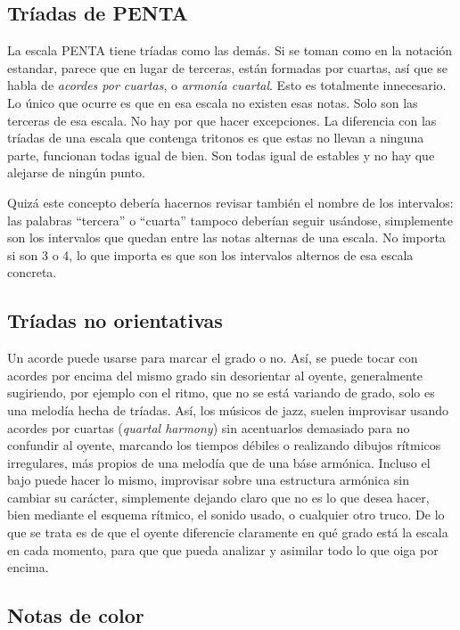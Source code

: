 \documentclass[]{report}
\begin{document}
\subsection{Tríadas de \textsf{PENTA}}

La escala \textsf{PENTA} tiene tríadas como las demás. Si se toman como en la notación estandar, parece que en lugar de terceras, están formadas por cuartas, así que se habla de \emph{acordes por cuartas}, o \emph{armonía cuartal}. Esto es totalmente innecesario. Lo único que ocurre es que en esa escala no existen esas notas. Solo son las terceras de esa escala. No hay por que hacer excepciones. La diferencia con las tríadas de una escala que contenga tritonos es que estas no llevan a ninguna parte, funcionan todas igual de bien. Son todas igual de estables y no hay que alejarse de ningún punto. 

Quizá este concepto debería hacernos revisar también el nombre de los intervalos: las palabras ``tercera'' o ``cuarta'' tampoco deberían seguir usándose, simplemente son los intervalos que quedan entre las notas alternas de una escala. No importa si son 3 o 4, lo que importa es que son los intervalos alternos de esa escala concreta.

\subsection{Tríadas no orientativas}

Un acorde puede usarse para marcar el grado o no. Así, se puede tocar con acordes por encima del mismo grado sin desorientar al oyente, generalmente sugiriendo, por ejemplo con el ritmo, que no se está variando de grado, solo es una melodía hecha de tríadas. Así, los músicos de jazz, suelen improvisar usando acordes por cuartas (\emph{quartal harmony}) sin acentuarlos demasiado para no confundir al oyente, marcando los tiempos débiles o realizando dibujos rítmicos irregulares, más propios de una melodía que de una báse armónica. Incluso el bajo puede hacer lo mismo, improvisar sobre una estructura armónica sin cambiar su carácter, simplemente dejando claro que no es lo que desea hacer, bien mediante el esquema rítmico, el sonido usado, o cualquier otro truco. De lo que se trata es de que el oyente diferencie claramente en qué grado está la escala en cada momento, para que que pueda analizar y asimilar todo lo que oiga por encima.

\subsection{Notas de color}
\end{document}
